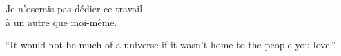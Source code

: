 \clearpage
\thispagestyle{plain}

\par\vspace*{.25\textheight}
\begin{flushright}
  Je n'oserais pas dédier ce travail \\à un autre que moi-même.
\end{flushright}


\par\vspace*{.25\textheight}
\begin{flushright}
``It would not be much of a universe if it wasn't home to the people
  you love.''\\
  \vspace*{0.5\baselineskip}
\end{flushright}
